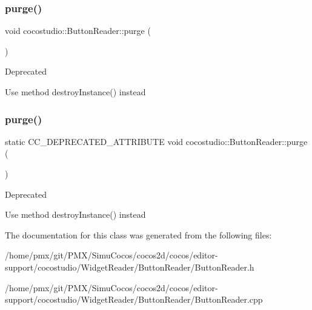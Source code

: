 \subsubsection{\texorpdfstring{purge()}{purge()}\hspace{0.1cm}{\footnotesize\ttfamily [1/2]}}
{\footnotesize\ttfamily void cocostudio\+::\+Button\+Reader\+::purge (\begin{DoxyParamCaption}{ }\end{DoxyParamCaption})\hspace{0.3cm}{\ttfamily [static]}}

\begin{DoxyRefDesc}{Deprecated}
\item[\hyperlink{deprecated__deprecated000084}{Deprecated}]Use method destroy\+Instance() instead \end{DoxyRefDesc}
\mbox{\label{classcocostudio_1_1ButtonReader_a23617bd605be5fe875bacc1ca1704bc6}} 
\subsubsection{\texorpdfstring{purge()}{purge()}\hspace{0.1cm}{\footnotesize\ttfamily [2/2]}}
{\footnotesize\ttfamily static C\+C\+\_\+\+D\+E\+P\+R\+E\+C\+A\+T\+E\+D\+\_\+\+A\+T\+T\+R\+I\+B\+U\+TE void cocostudio\+::\+Button\+Reader\+::purge (\begin{DoxyParamCaption}{ }\end{DoxyParamCaption})\hspace{0.3cm}{\ttfamily [static]}}

\begin{DoxyRefDesc}{Deprecated}
\item[\hyperlink{deprecated__deprecated000319}{Deprecated}]Use method destroy\+Instance() instead \end{DoxyRefDesc}


The documentation for this class was generated from the following files\+:\begin{DoxyCompactItemize}
\item 
/home/pmx/git/\+P\+M\+X/\+Simu\+Cocos/cocos2d/cocos/editor-\/support/cocostudio/\+Widget\+Reader/\+Button\+Reader/Button\+Reader.\+h\item 
/home/pmx/git/\+P\+M\+X/\+Simu\+Cocos/cocos2d/cocos/editor-\/support/cocostudio/\+Widget\+Reader/\+Button\+Reader/Button\+Reader.\+cpp\end{DoxyCompactItemize}
